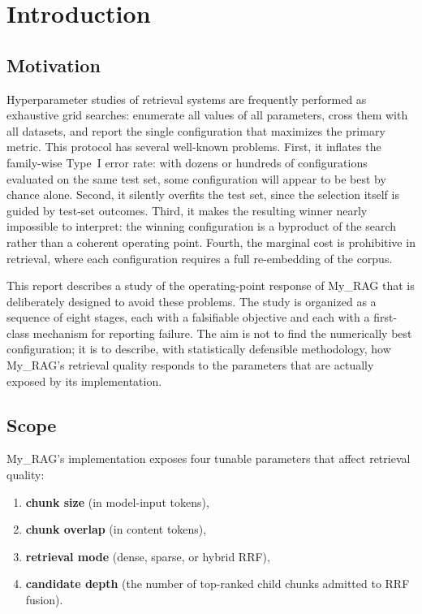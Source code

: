 \documentclass[11pt,a4paper]{article}
\begin{document}
\newpage
\tableofcontents
\newpage

\section{Introduction}

\subsection{Motivation}
Hyperparameter studies of retrieval systems are frequently performed
as exhaustive grid searches: enumerate all values of all parameters,
cross them with all datasets, and report the single configuration that
maximizes the primary metric. This protocol has several well-known
problems. First, it inflates the family-wise Type~I error rate: with
dozens or hundreds of configurations evaluated on the same test set,
some configuration will appear to be best by chance alone. Second,
it silently overfits the test set, since the selection itself is
guided by test-set outcomes. Third, it makes the resulting winner
nearly impossible to interpret: the winning configuration is a
byproduct of the search rather than a coherent operating point.
Fourth, the marginal cost is prohibitive in retrieval, where each
configuration requires a full re-embedding of the corpus.

This report describes a study of the operating-point response of
My\_RAG that is deliberately designed to avoid these problems. The
study is organized as a sequence of eight stages, each with a
falsifiable objective and each with a first-class mechanism for
reporting failure. The aim is not to find the numerically best
configuration; it is to describe, with statistically defensible
methodology, how My\_RAG's retrieval quality responds to the
parameters that are actually exposed by its implementation.

\subsection{Scope}
My\_RAG's implementation exposes four tunable parameters that affect
retrieval quality:

\begin{enumerate}[leftmargin=1.5em,itemsep=0.15em]
  \item \textbf{chunk size} (in model-input tokens),
  \item \textbf{chunk overlap} (in content tokens),
  \item \textbf{retrieval mode} (dense, sparse, or hybrid RRF),
  \item \textbf{candidate depth} (the number of top-ranked child
    chunks admitted to RRF fusion).
\end{enumerate}
\end{document}
